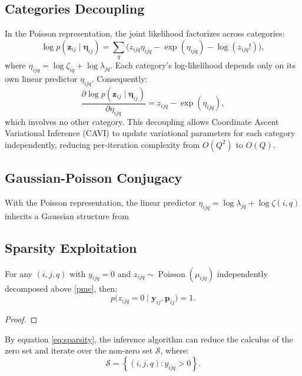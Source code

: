 \documentclass[]{report}
\theoremstyle{definition}
\begin{document}
    \subsection{Categories Decoupling}
    \label{decoupling}
 In the Poisson representation, the joint likelihood factorizes across categories:
    \begin{equation}
        \log p(\bm{z}_{ij}\mid \bm{\eta}_{ij})=\sum_{q} \bigl(z_{ijq} \eta_{ijq}-\exp (\eta_{ijq})-\log (z_{ijq}!)\bigr),
    \end{equation}
where $\eta_{ijq}=\log \zeta_{iq}+\log \lambda_{jq}$. Each category's log-likelihood depends only on its own linear predictor $\eta_{ijq}$. Consequently: 
    \begin{equation}
    \dfrac{\partial \log p(\bm{z}_{ij}\mid \bm{\eta}_{ij})}{\partial \eta_{ijq}}=z_{ijq}-\exp (\eta_{ijq}),
    \end{equation}
which involves no other category. This decoupling allows Coordinate Ascent Variational Inference (CAVI) to update variational parameters for each category independently, reducing per-iteration complexity from $O(Q^{2})$ to $O(Q)$. 
  \subsection{Gaussian-Poisson Conjugacy}
  \label{conjugacy}
With the Poisson representation, the linear predictor $\eta_{ijq}=\log \lambda_{jq}+\log \zeta(i,q)$ inherits a Gaussian structure from 

  \subsection{Sparsity Exploitation}
  \label{Sparsity}
For any $(i,j,q)$ with $y_{ijq}=0$ and $z_{ijq}\sim \operatorname{Poisson}(\mu_{ijq})$ independently decomposed above \ref{pme}, then:
\begin{equation}
    p\bigl(z_{ijq}=0\mid \bm{y}_{ij},\bm{p}_{ij}\bigr)=1.
    \label{eq:sparsity}
\end{equation}
\begin{proof}

\end{proof}
By equation \ref{eq:sparsity}, the inference algorithm can reduce the calculus of the zero set and iterate over the non-zero set $\mathcal{S}$, where:
\begin{equation}
\mathcal{S}=\left\{(i,j,q): y_{ijq}>0\right\}.
\end{equation}
\end{document}
